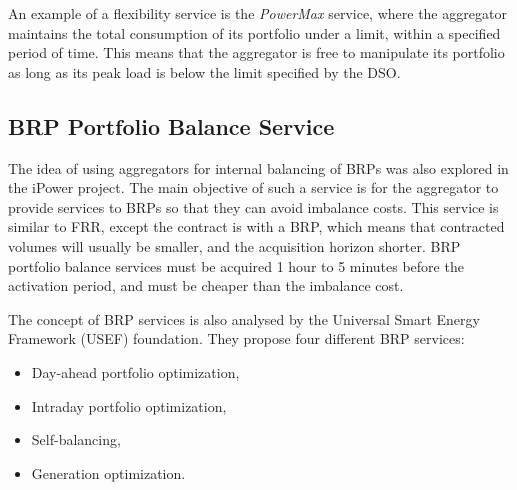 
An example of a flexibility service is the \emph{PowerMax} service, where the aggregator maintains the total consumption of its portfolio under a limit, within a specified period of time. This means that the aggregator is free to manipulate its portfolio as long as its peak load is below the limit specified by the DSO.
\subsection{BRP Portfolio Balance Service} %
\label{sub:BRPPortfolioBalance}
The idea of using aggregators for internal balancing of BRPs was also explored in the iPower project. The main objective of such a service is for the aggregator to provide services to BRPs so that they can avoid imbalance costs. This service is similar to FRR, except the contract is with a BRP, which means that contracted volumes will usually be smaller, and the acquisition horizon shorter. BRP portfolio balance services must be acquired 1 hour to 5 minutes before the activation period, and must be cheaper than the imbalance cost.

The concept of BRP services is also analysed by the Universal Smart Energy Framework (USEF) foundation. They propose four different BRP services:
\begin{itemize}
	\item Day-ahead portfolio optimization,
	\item Intraday portfolio optimization,
	\item Self-balancing,
	\item Generation optimization.
\end{itemize}

